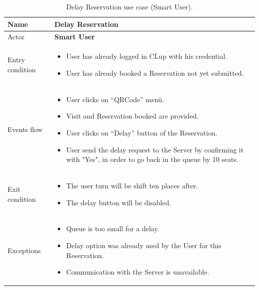 \begin{table}[H]\begin{tabular}{|p{5cm} | p{7cm} | }
	\hline
	Name & \textbf{Delay Reservation} \\
	\hline
	Actor & \textbf{Smart User}\\
	\hline
	Entry condition &
	\begin{itemize}
		\item User has already logged in CLup with his credential. 
		\item User has already booked a Reservation not yet submitted.
	\end{itemize} \\
	\hline
	Events flow & 
	\begin{itemize}
		\item User clicks on “QRCode” menù.
		\item Visit and Reservation booked are provided.
		\item User clicks on “Delay” button of the Reservation.
		\item User send the delay request to the Server by confirming it with "Yes", in order to go back in the queue by 10 seats.
	\end{itemize} \\
	\hline
	Exit condition &
	\begin{itemize}
		\item The user turn will be shift ten places after.
		\item The delay button will be disabled.
	\end{itemize} \\
	\hline 
	Exceptions & 
	\begin{itemize}
		\item Queue is too small for a delay.
		\item Delay option was already used by the User for this Reservation.
    	\item Communication with the Server is unavailable.
	\end{itemize} \\
	\hline
\end{tabular}
\caption{Delay Reservation use case (Smart User).}
\end{table}

\bigbreak

